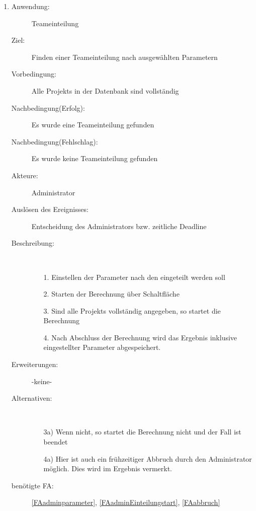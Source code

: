 \documentclass[parskip=full]{scrartcl}
\newcommand{\swtLabel}[1]{\textbf{/#1\arabic*0/}}
\begin{document}
\begin{enumerate} [label=\swtLabel{A}]
  
  \item
  \begin{description}
  \item[Anwendung:] Teameinteilung
  \item[Ziel:] Finden einer Teameinteilung nach ausgewählten Parametern
  	\item[Vorbedingung:] Alle \glspl{Projekt} in der Datenbank sind vollständig
  	\item[Nachbedingung(Erfolg):] Es wurde eine Teameinteilung gefunden
  	\item[Nachbedingung(Fehlschlag):] Es wurde keine Teameinteilung gefunden
  	\item[Akteure:] Administrator
  	\item[Auslösen des Ereignisses:] Entscheidung des Administrators bzw.
  	zeitliche Deadline
  	\item[Beschreibung:]~
  	\begin{enumerate} 
  	  \item[1.] Einstellen der Parameter nach den eingeteilt werden soll
  	  \item[2.] Starten der Berechnung über Schaltfläche
  	  \item[3.] Sind alle \glspl{Projekt} vollständig angegeben, so startet die
  	  Berechnung
  	  \item[4.] Nach Abschluss der Berechnung wird das Ergebnis inklusive
  	  eingestellter Parameter abgespeichert.
  	\end{enumerate}
  	\item[Erweiterungen:] -keine-
  	\item[Alternativen:] ~
  	\begin{enumerate}
  	  \item[3a)] Wenn nicht, so startet die Berechnung nicht und der Fall ist
  	  beendet
  	  \item[4a)] Hier ist auch ein frühzeitiger Abbruch durch den Administrator
  	  möglich. Dies wird im Ergebnis vermerkt.
  	 \end{enumerate}  
  	 \item[benötigte FA:] \ref{FAadminparameter},
  	 \ref{FAadminEinteilungstart}, \ref{FAabbruch}
  \end{description}
   

\end{enumerate}
\end{document}
